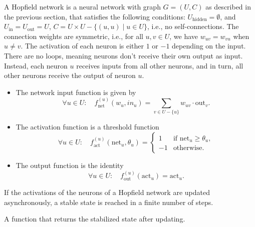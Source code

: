 \begin{definition}\label{HopfieldNetwork}
\leanok
A Hopfield network is a neural network with graph $G = (U,C)$ as described in the previous section, 
that satisfies the following conditions:
\( U_{\text{hidden}} = \emptyset \), and \( U_{\text{in}} = U_{\text{out}} = U \),
 \( C = U \times U - \{(u, u) \mid u \in U \} \), i.e., no self-connections. 
The connection weights are symmetric, i.e., for all \( u, v \in U \), we have \( w_{uv} = w_{vu} \) when \( u \neq v \). 
The activation of each neuron is either \( 1 \) or \( -1 \) depending on the input. There are no loops, meaning neurons don’t 
receive their own output as input. Instead, each neuron $u$ receives inputs from all other neurons, and in turn, all other neurons
 receive the output of neuron $u$. 
\begin{itemize}
\item The network input function is given by
    \[
  \forall u \in U : \quad f^{(u)}_{\text{net}}(w_u, in_u) = \sum_{v \in U - \{u\}} w_{uv} \cdot \text{out}_v.
  \]
\item The activation function is a threshold function
\[\forall u \in U : \quad f^{(u)}_{\text{act}}(\text{net}_u, \theta_u) =
  \begin{cases} 
    1 & \text{if } \text{net}_u \geq \theta_u, \\
    -1 & \text{otherwise}.
  \end{cases}
  \]
\item  The output function is the identity
\[\forall u \in U : \quad f^{(u)}_{\text{out}}(\text{act}_u) = \text{act}_u.
  \]
\end{itemize}
\end{definition}

\begin{theorem}\label{HopfieldNet_convergence_fair}
\leanok  
If the activations of the neurons of a Hopfield network are updated asynchronously,
a stable state is reached in a finite number of steps.
\end{theorem}

\begin{theorem} \label{HopfieldNet_stabilize}
\leanok  
A function that returns the stabilized state after updating.
\end{theorem}

